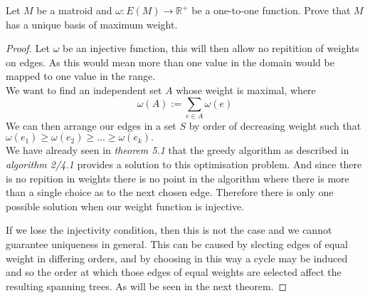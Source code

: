 \documentclass[../main.tex]{subfiles}
\begin{document}
\begin{lem}
Let $M$ be a matroid and $\omega: E(M) \longrightarrow \mathbb{R^+}$ be a one-to-one function. Prove that $M$ has a unique basis of maximum weight.
\end{lem}
\begin{proof}
Let $\omega$ be an injective function, this will then allow no repitition of weights on edges. As this would mean more than one value in the domain would be mapped to one value in the range.\\
We want to find an independent set $A$ whose weight is maximal, where
\begin{equation}
\omega(A) := \sum_{e \in A} \omega (e)
\end{equation}
We can then arrange our edges in a set $S$ by order of decreasing weight such that $\omega(e_1) \geq \omega(e_2) \geq ... \geq \omega(e_k).$\\
We have already seen in \textit{theorem 5.1} that the greedy algorithm as described in \textit{algorithm 2/4.1} provides a solution to this optimisation problem. And since there is no repition in weights there is no point in the algorithm where there is more than a single choice as to the next chosen edge. Therefore there is only one possible solution when our weight function is injective.

\vspace{3mm}

If we lose the injectivity condition, then this is not the case and we cannot guarantee uniqueness in general. This can be caused by slecting edges of equal weight in differing orders, and by choosing in this way a cycle may be induced and so the order at which those edges of equal weights are selected affect the resulting spanning trees. As will be seen in the next theorem.
\end{proof}
\end{document}
